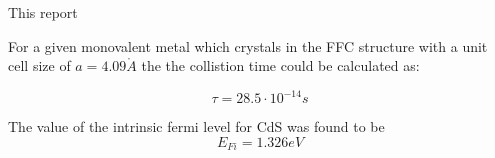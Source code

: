 


This report 


For a given monovalent metal which crystals in the FFC structure
with a unit cell size of  $a = 4.09 \mathring{A}$ the the collistion
time could be calculated as:

$$\tau = 28.5 \cdot 10^{-14}s$$


The value of the intrinsic fermi level for CdS was found to be
$$E_{Fi} = 1.326 eV$$